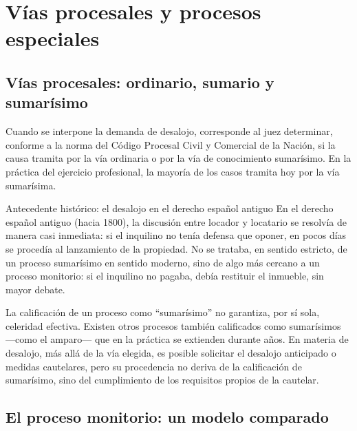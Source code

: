 \documentclass[12pt,oneside]{book}
\begin{document}
\chapter{Vías procesales y procesos especiales}
\label{cap:vias}

\section{Vías procesales: ordinario, sumario y sumarísimo}

Cuando se interpone la demanda de desalojo, corresponde al juez determinar, conforme a la norma del Código Procesal Civil y Comercial de la Nación, si la causa tramita por la vía ordinaria o por la vía de conocimiento sumarísimo. En la práctica del ejercicio profesional, la mayoría de los casos tramita hoy por la vía sumarísima.

\begin{example}{Antecedente histórico: el desalojo en el derecho español antiguo}
En el derecho español antiguo (hacia 1800), la discusión entre locador y locatario se resolvía de manera casi inmediata: si el inquilino no tenía defensa que oponer, en pocos días se procedía al lanzamiento de la propiedad. No se trataba, en sentido estricto, de un proceso sumarísimo en sentido moderno, sino de algo más cercano a un proceso monitorio: si el inquilino no pagaba, debía restituir el inmueble, sin mayor debate.
\end{example}

\begin{important}
La calificación de un proceso como ``sumarísimo'' no garantiza, por sí sola, celeridad efectiva. Existen otros procesos también calificados como sumarísimos ---como el amparo--- que en la práctica se extienden durante años. En materia de desalojo, más allá de la vía elegida, es posible solicitar el desalojo anticipado o medidas cautelares, pero su procedencia no deriva de la calificación de sumarísimo, sino del cumplimiento de los requisitos propios de la cautelar.
\end{important}


\section{El proceso monitorio: un modelo comparado}
\end{document}
